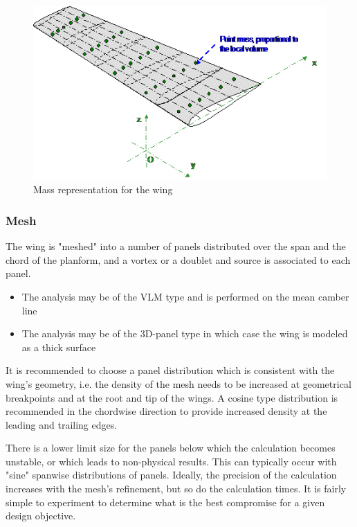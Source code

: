 \documentclass[a4paper,twoside,12pt,dvips]{article}
\begin{document}
\begin{figure}[htbp]
  \includegraphics[width=0.8\linewidth]{img-10}\centering 
  \caption{Mass representation for the wing}
  \label{fig:mass_representation_for_the_wing}
\end{figure}


\subsubsection{Mesh}

The wing is "meshed" into a number of panels distributed over the
span and the chord of the planform, and a vortex or a doublet and
source is associated to each panel.

\begin{itemize}
\item The analysis may be of the VLM type and is performed on the mean
camber line
\item The analysis may be of the 3D-panel type in which case the wing
is modeled as a thick surface
\end{itemize}

It is recommended to choose a panel distribution which is consistent
with the wing's geometry, i.e. the density of the mesh needs to be
increased at geometrical breakpoints and at the root and tip of the
wings. A cosine type distribution is recommended in the chordwise
direction to provide increased density at the leading and trailing
edges.

There is a lower limit size for the panels below which the calculation
becomes unstable, or which leads to non-physical results. This can
typically occur with "sine" spanwise distributions of
panels. Ideally, the precision of the calculation increases with the
mesh's refinement, but so do the calculation times. It is fairly
simple to experiment to determine what is the best compromise for a
given design objective.
\end{document}
